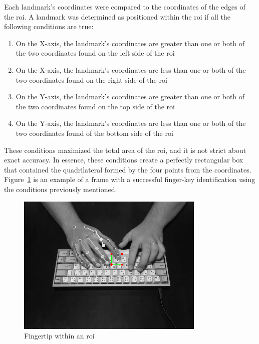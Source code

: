 \documentclass{report}
\begin{document}
Each landmark's coordinates were compared to the coordinates of the edges of the
\ac{roi}. A landmark was determined as positioned within the \ac{roi} if all the
following conditions are true:

\begin{enumerate}
	\item On the X-axis, the landmark's coordinates are greater than one or both of
	      the two coordinates found on the left side of the \ac{roi}
	\item On the X-axis, the landmark's coordinates are less than one or both of
	      the two coordinates found on the right side of the \ac{roi}
	\item On the Y-axis, the landmark's coordinates are greater than one or both of
	      the two coordinates found on the top side of the \ac{roi}
	\item On the Y-axis, the landmark's coordinates are less than one or both of
	      the two coordinates found of the bottom side of the \ac{roi}
\end{enumerate}

These conditions maximized the total area of the \ac{roi}, and it is not strict
about exact accuracy. In essence, these conditions create a perfectly
rectangular box that contained the quadrilateral formed by the four points from
the coordinates. Figure~\ref{fig:metho-algo-sample} is an example of a frame with a
successful finger-key identification using the conditions previously mentioned.

\begin{figure}[H]
	\centering
	\includegraphics[width=0.8\textwidth]{detected-finger.png}
	\caption{Fingertip within an \ac{roi}}
	\label{fig:metho-algo-sample}
	\centering
\end{figure}
\end{document}
